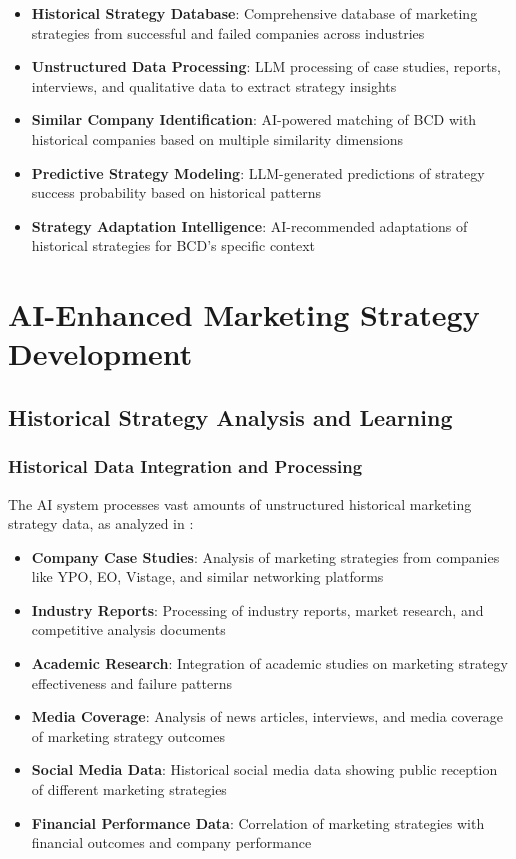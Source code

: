 \begin{itemize}
    \item \textbf{Historical Strategy Database}: Comprehensive database of marketing strategies from successful and failed companies across industries
    \item \textbf{Unstructured Data Processing}: LLM processing of case studies, reports, interviews, and qualitative data to extract strategy insights
    \item \textbf{Similar Company Identification}: AI-powered matching of BCD with historical companies based on multiple similarity dimensions
    \item \textbf{Predictive Strategy Modeling}: LLM-generated predictions of strategy success probability based on historical patterns
    \item \textbf{Strategy Adaptation Intelligence}: AI-recommended adaptations of historical strategies for BCD's specific context
\end{itemize}

\section{AI-Enhanced Marketing Strategy Development}

\subsection{Historical Strategy Analysis and Learning}

\subsubsection{Historical Data Integration and Processing}

The AI system processes vast amounts of unstructured historical marketing strategy data, as analyzed in \citep{minina_the_effect_of}:

\begin{itemize}
    \item \textbf{Company Case Studies}: Analysis of marketing strategies from companies like YPO, EO, Vistage, and similar networking platforms
    \item \textbf{Industry Reports}: Processing of industry reports, market research, and competitive analysis documents
    \item \textbf{Academic Research}: Integration of academic studies on marketing strategy effectiveness and failure patterns
    \item \textbf{Media Coverage}: Analysis of news articles, interviews, and media coverage of marketing strategy outcomes
    \item \textbf{Social Media Data}: Historical social media data showing public reception of different marketing strategies
    \item \textbf{Financial Performance Data}: Correlation of marketing strategies with financial outcomes and company performance
\end{itemize}

